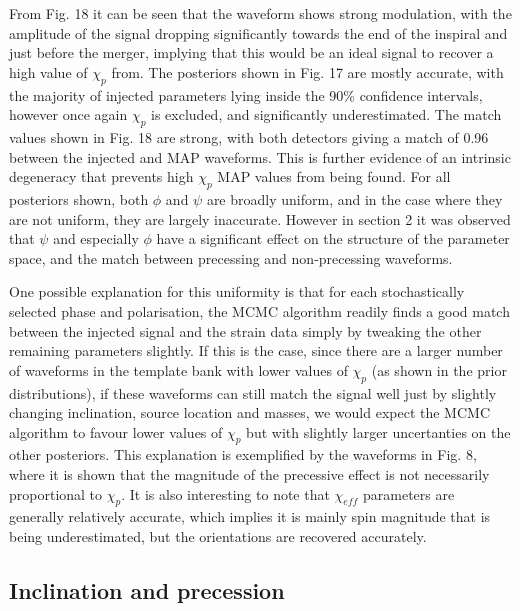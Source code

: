 \documentclass[11pt]{article}
\begin{document}
From Fig. 18 it can be seen that the waveform shows strong modulation, with the amplitude of the signal dropping significantly towards the end of the inspiral and just before the merger, implying that this would be an ideal signal to recover a high value of $\chi_p$ from. The posteriors shown in Fig. 17 are mostly accurate, with the majority of injected parameters lying inside the 90\% confidence intervals, however once again $\chi_p$ is excluded, and significantly underestimated. The match values shown in Fig. 18 are strong, with both detectors giving a match of 0.96 between the injected and MAP waveforms. This is further evidence of an intrinsic degeneracy that prevents high $\chi_p$ MAP values from being found. For all posteriors shown, both $\phi$ and $\psi$ are broadly uniform, and in the case where they are not uniform, they are largely inaccurate. However in section 2 it was observed that $\psi$ and especially $\phi$ have a significant effect on the structure of the parameter space, and the match between precessing and non-precessing waveforms.

One possible explanation for this uniformity is that for each stochastically selected phase and polarisation, the MCMC algorithm readily finds a good match between the injected signal and the strain data simply by tweaking the other remaining parameters slightly. If this is the case, since there are a larger number of waveforms in the template bank with lower values of $\chi_p$ (as shown in the prior distributions), if these waveforms can still match the signal well just by slightly changing inclination, source location and masses, we would expect the MCMC algorithm to favour lower values of $\chi_p$ but with slightly larger uncertanties on the other posteriors. This explanation is exemplified by the waveforms in Fig. 8, where it is shown that the magnitude of the precessive effect is not necessarily proportional to $\chi_p$. It is also interesting to note that $\chi_{eff}$ parameters are generally relatively accurate, which implies it is mainly spin magnitude that is being underestimated, but the orientations are recovered accurately.

\subsection{Inclination and precession}
\end{document}
